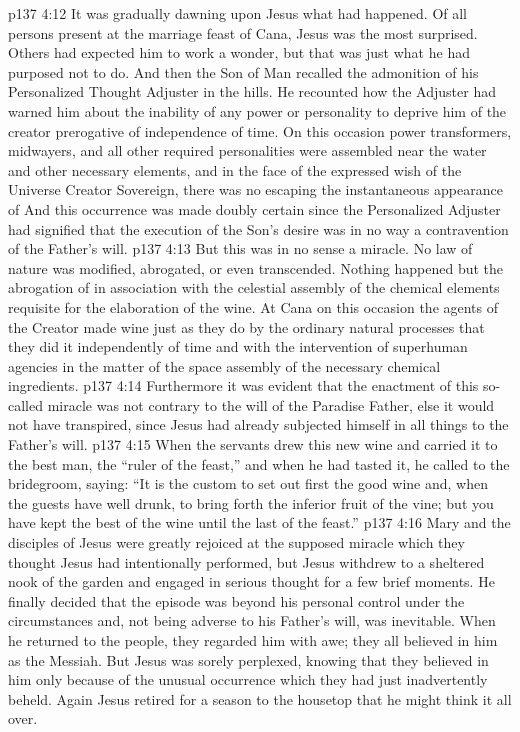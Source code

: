 \vs p137 4:12 It was gradually dawning upon Jesus what had happened. Of all persons present at the marriage feast of Cana, Jesus was the most surprised. Others had expected him to work a wonder, but that was just what he had purposed not to do. And then the Son of Man recalled the admonition of his Personalized Thought Adjuster in the hills. He recounted how the Adjuster had warned him about the inability of any power or personality to deprive him of the creator prerogative of independence of time. On this occasion power transformers, midwayers, and all other required personalities were assembled near the water and other necessary elements, and in the face of the expressed wish of the Universe Creator Sovereign, there was no escaping the instantaneous appearance of  And this occurrence was made doubly certain since the Personalized Adjuster had signified that the execution of the Son’s desire was in no way a contravention of the Father’s will.
\vs p137 4:13 But this was in no sense a miracle. No law of nature was modified, abrogated, or even transcended. Nothing happened but the abrogation of  in association with the celestial assembly of the chemical elements requisite for the elaboration of the wine. At Cana on this occasion the agents of the Creator made wine just as they do by the ordinary natural processes  that they did it independently of time and with the intervention of superhuman agencies in the matter of the space assembly of the necessary chemical ingredients.
\vs p137 4:14 Furthermore it was evident that the enactment of this so\hyp{}called miracle was not contrary to the will of the Paradise Father, else it would not have transpired, since Jesus had already subjected himself in all things to the Father’s will.
\vs p137 4:15 \pc When the servants drew this new wine and carried it to the best man, the “ruler of the feast,” and when he had tasted it, he called to the bridegroom, saying: “It is the custom to set out first the good wine and, when the guests have well drunk, to bring forth the inferior fruit of the vine; but you have kept the best of the wine until the last of the feast.”
\vs p137 4:16 Mary and the disciples of Jesus were greatly rejoiced at the supposed miracle which they thought Jesus had intentionally performed, but Jesus withdrew to a sheltered nook of the garden and engaged in serious thought for a few brief moments. He finally decided that the episode was beyond his personal control under the circumstances and, not being adverse to his Father’s will, was inevitable. When he returned to the people, they regarded him with awe; they all believed in him as the Messiah. But Jesus was sorely perplexed, knowing that they believed in him only because of the unusual occurrence which they had just inadvertently beheld. Again Jesus retired for a season to the housetop that he might think it all over.
